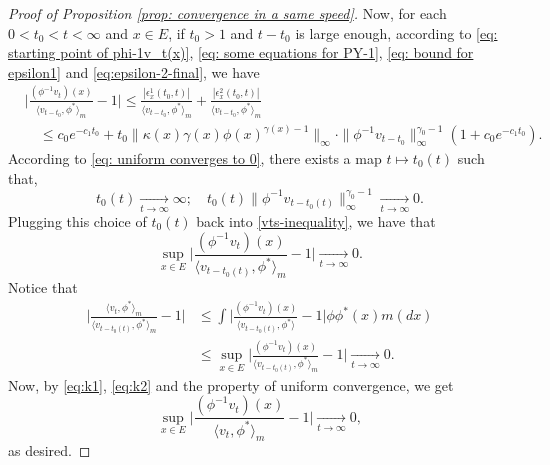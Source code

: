\documentclass[12pt, a4paper]{amsart}
\theoremstyle{definition}
\numberwithin{equation}{section}
\begin{document}
\begin{proof}[Proof of Proposition \ref{prop: convergence in a same speed}]
	Now, for each $0<t_0<t<\infty$ and $x\in E$, if $t_0 > 1$ and $t-t_0$ is large enough, 
	according to \eqref{eq: starting point of phi-1v_t(x)}, \eqref{eq: some equations for PY-1}, \eqref{eq: bound for epsilon1} and \eqref{eq:epsilon-2-final}, we have
\[\label{vts-inequality}\begin{split}
	&\Big|\frac{(\phi^{-1}v_t)(x)}{\langle v_{t-t_0},\phi^* \rangle_m}-1 \Big|
	\leq \frac{|\epsilon_x^1(t_0,t)|}{\langle v_{t-t_0},\phi^* \rangle_m} + \frac{|\epsilon_x^2(t_0,t)|}{\langle v_{t-t_0},\phi^* \rangle_m}\\
	&\quad \leq c_0e^{-c_1 t_0} +t_0\|\kappa(x)\gamma(x)\phi(x)^{\gamma(x) - 1}\|_{\infty} 
	\cdot \|\phi^{-1}v_{t-t_0}\|^{\gamma_0-1}_\infty (1+c_0 e^{-c_1 t_0}).
\end{split}\]
	According to \eqref{eq: uniform converges to 0},
	there exists a map $t\mapsto t_0(t)$ such that,
\[
	t_0(t)
	\xrightarrow[t\to\infty]{} \infty;
	\quad t_0(t)\| \phi^{-1}v_{t-t_0(t)}\|^{\gamma_0 - 1}_\infty
	\xrightarrow[t\to\infty]{} 0.
\]
	Plugging this choice of $t_0(t)$ back into \eqref{vts-inequality}, we have that
\[\label{eq:k1}
	\sup_{x\in E}\Big|\frac{(\phi^{-1}v_t)(x)}{\langle v_{t-t_0(t)},\phi^* \rangle_m}-1 \Big|
	\xrightarrow[t\to\infty]{} 0.
\]
	Notice that
\[\label{eq:k2}\begin{split}
	\Big |\frac {\langle v_t, \phi^*\rangle_m} {\langle v_{t-t_0(t)} , \phi^*\rangle_m} - 1 \Big |
	&\leq \int \Big | \frac{(\phi^{-1}v_t)(x)}{\langle v_{t-t_0(t)} , \phi^*\rangle} - 1 \Big| \phi \phi^*(x) m(dx)\\
	&\leq \sup_{x\in E}\Big|\frac{(\phi^{-1}v_t)(x)}{\langle v_{t-t_0(t)},\phi^* \rangle_m}-1 \Big|
	\xrightarrow[t\to\infty]{} 0.
\end{split}\]
	Now, by \eqref{eq:k1}, \eqref{eq:k2} and the property of uniform convergence, we get
\[
	\sup_{x\in E}\Big|\frac{(\phi^{-1}v_t)(x)}{\langle v_{t},\phi^* \rangle_m}-1 \Big|
	\xrightarrow[t\to\infty]{} 0,
\]
	as desired.
\end{proof}
\end{document}
